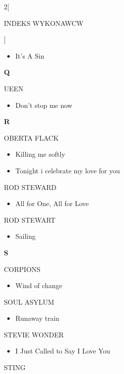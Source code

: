 \documentclass[a4paper]{report}
\begin{document}
\begin{multicols*}{2}[\begin{Huge}INDEKS WYKONAWCW\end{Huge}\vspace{1cm}]
\begin{itemize}[topsep=0pt]
\itemsep0em
\item[]  It's A Sin   \\
\end{itemize}
 \begin{Large}\textbf{Q}\end{Large}UEEN 
\begin{itemize}[topsep=0pt]
\itemsep0em
\item[]  Don't stop me now   \\
\end{itemize}
 \begin{Large}\textbf{R}\end{Large}OBERTA FLACK 
\begin{itemize}[topsep=0pt]
\itemsep0em
\item[]  Killing me softly   \\
\item[]  Tonight i celebrate my love for you   \\
\end{itemize}
 ROD STEWARD 
\begin{itemize}[topsep=0pt]
\itemsep0em
\item[]  All for One, All for Love   \\
\end{itemize}
 ROD STEWART 
\begin{itemize}[topsep=0pt]
\itemsep0em
\item[]  Sailing   \\
\end{itemize}
 \begin{Large}\textbf{S}\end{Large}CORPIONS 
\begin{itemize}[topsep=0pt]
\itemsep0em
\item[]  Wind of change   \\
\end{itemize}
 SOUL ASYLUM 
\begin{itemize}[topsep=0pt]
\itemsep0em
\item[]  Runaway train   \\
\end{itemize}
 STEVIE WONDER 
\begin{itemize}[topsep=0pt]
\itemsep0em
\item[]  I Just Called to Say I Love You   \\
\end{itemize}
 STING 
\begin{itemize}[topsep=0pt]

\end{itemize}
\end{multicols*}
\end{document}
